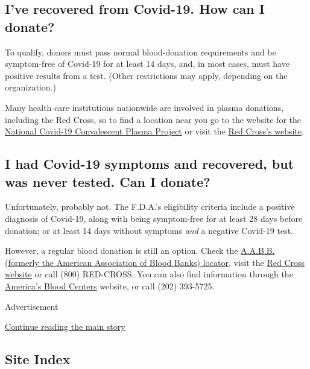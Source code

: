 \hypertarget{ive-recovered-from-covid-19-how-can-i-donate}{%
\subsection{I've recovered from Covid-19. How can I
donate?}\label{ive-recovered-from-covid-19-how-can-i-donate}}

To qualify, donors must pass normal blood-donation requirements and be
symptom-free of Covid-19 for at least 14 days, and, in most cases, must
have positive results from a test. (Other restrictions may apply,
depending on the organization.)

Many health care institutions nationwide are involved in plasma
donations, including the Red Cross, so to find a location near you go to
the website for the \href{https://ccpp19.org/}{National Covid-19
Convalescent Plasma Project} or visit the
\href{https://www.redcrossblood.org/donate-blood/dlp/plasma-donations-from-recovered-covid-19-patients.html}{Red
Cross's website}.

\hypertarget{i-had-covid-19-symptoms-and-recovered-but-was-never-tested-can-i-donate}{%
\subsection{I had Covid-19 symptoms and recovered, but was never tested.
Can I
donate?}\label{i-had-covid-19-symptoms-and-recovered-but-was-never-tested-can-i-donate}}

Unfortunately, probably not. The F.D.A.'s eligibility criteria include a
positive diagnosis of Covid-19, along with being symptom-free for at
least 28 days before donation; or at least 14 days without symptoms
\emph{and} a negative Covid-19 test.

However, a regular blood donation is still an option. Check the
\href{http://www.aabb.org/tm/donation/Pages/Blood-Bank-Locator.aspx}{A.A.B.B.
(formerly the American Association of Blood Banks) locator}, visit the
\href{https://www.redcrossblood.org/}{Red Cross website} or call (800)
RED-CROSS. You can also find information through the
\href{https://americasblood.org/for-donors/}{America's Blood Centers}
website, or call (202) 393-5725.

Advertisement

\protect\hyperlink{after-bottom}{Continue reading the main story}

\hypertarget{site-index}{%
\subsection{Site Index}\label{site-index}}


